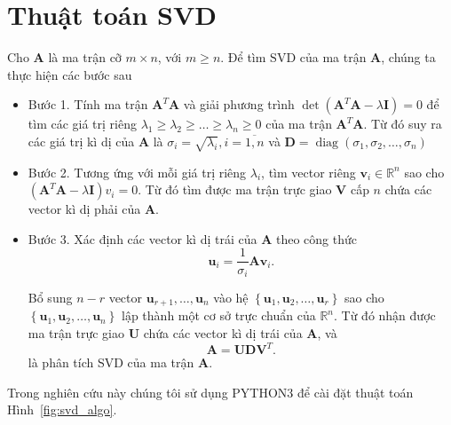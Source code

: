 \documentclass[12pt,a4paper,oneside]{report}
\numberwithin{equation}{section}
\begin{document}
\section{Thuật toán SVD}
Cho $\mathbf{A}$ là ma trận cỡ $m \times n$, với $m \geq n$. Để tìm $\mathrm{SVD}$ của ma trận $\mathbf{A}$, chúng ta thực hiện các bước sau
\begin{itemize}

 \item Bước 1. Tính ma trận $\mathbf{A}^{T} \mathbf{A}$ và giải phương trình $\operatorname{det}\left(\mathbf{A}^{T} \mathbf{A}-\lambda \mathbf{I}\right)=0$ để tìm các giá trị riêng $\lambda_{1} \geq \lambda_{2} \geq \ldots \geq \lambda_{n} \geq 0$ của ma trận $\mathbf{A}^{T} \mathbf{A}$. Từ đó suy ra các giá trị kì dị của $\mathbf{A}$ là $\sigma_{i}=\sqrt{\lambda_{i}}, i=\overline{1, n}$ và $\mathbf{D}=\operatorname{diag}\left(\sigma_{1}, \sigma_{2}, \ldots, \sigma_{n}\right)$
\item Bước 2. Tương ứng với mỗi giá trị riêng $\lambda_{i}$, tìm vector riêng $\mathbf{v}_{i} \in \mathbb{R}^{n}$ sao cho $\left(\mathbf{A}^{T} \mathbf{A}-\lambda \mathbf{I}\right) v_{i}=0$. Từ đó tìm được ma trận trực giao $\mathbf{V}$ cấp $n$ chứa các vector kì dị phải của $\mathbf{A}$.
\item Bước 3. Xác định các vector kì dị trái của $\mathbf{A}$ theo công thức
$$
\mathbf{u}_{i}=\frac{1}{\sigma_{i}} \mathbf{A} \mathbf{v}_{i}.
$$

Bổ sung $n-r$ vector $\mathbf{u}_{r+1}, \ldots, \mathbf{u}_{n}$ vào hệ $\left\{\mathbf{u}_{1}, \mathbf{u}_{2}, \ldots, \mathbf{u}_{r}\right\}$ sao cho $\left\{\mathbf{u}_{1},\mathbf{u}_{2}, \ldots, \mathbf{u}_{n}\right\}$ lập thành một cơ sở trực chuẩn của $\mathbb{R}^{n}$. Từ đó nhận được ma trận trực giao $\mathbf{U}$ chứa các vector kì dị trái của $\mathbf{A}$, và
$$
\mathbf{A}=\mathbf{U D V}^{T}.
$$
là phân tích SVD của ma trận $\mathbf{A}$.
\end{itemize}
Trong nghiên cứu này chúng tôi sử dụng PYTHON3 để cài đặt thuật toán Hình~\ref{fig:svd_algo}.
\end{document}
